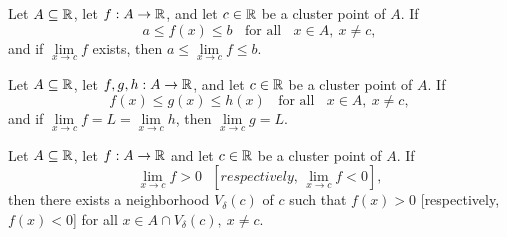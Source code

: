 \begin{theorem}
	Let $A \subseteq \mathbb{R}$, let $f: A \rightarrow \mathbb{R}$, and let $c \in \mathbb{R}$ be a cluster point of $A$. If
	\[a \leq f(x) \leq b\ \ \ \ \text{for all}\ \ \ \ x \in A,\ x \neq c,\]
	and if $\lim\limits_{x\to c} f$ exists, then $a \leq \lim\limits_{x\to c} f \leq b$.
\end{theorem}

\begin{theorem}
	Let $A \subseteq \mathbb{R}$, let $f,g,h:A \rightarrow \mathbb{R}$, and let $c \in \mathbb{R}$ be a cluster point of $A$. If
	\[f(x) \leq g(x) \leq h(x)\ \ \ \ \text{for all}\ \ \ \ x \in A,\ x \neq c,\]
	and if $\lim\limits_{x\to c} f = L = \lim\limits_{x\to c} h$, then $\lim\limits_{x\to c} g =L$.
\end{theorem}

\begin{theorem}
	Let $A \subseteq \mathbb{R}$, let $f:A \rightarrow \mathbb{R}$ and let $c \in \mathbb{R}$ be a cluster point of $A$. If
	\[\lim\limits_{x\to c} f > 0\ \ \ \left[\textit{respectively, } \lim\limits_{x\to c} f < 0\right],\]
	then there exists a neighborhood $V_\delta (c)$ of $c$ such that $f(x) > 0$ [respectively, $f(x) < 0$] for all $x \in A \cap V_\delta (c),\ x \neq c$.
\end{theorem}
